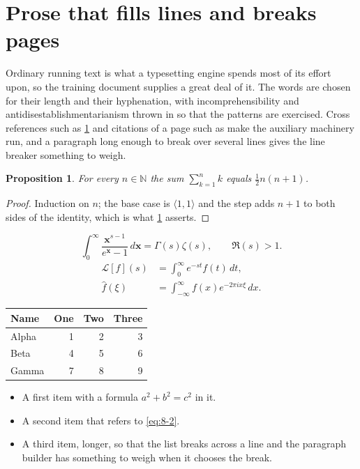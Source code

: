 \documentclass[11pt,a4paper]{report}
\theoremstyle{plain}
\newtheorem{proposition}{Proposition}[chapter]
\newcommand{\vecn}[1]{\mathbf{#1}}
\newcommand{\pairs}[2]{\langle #1,#2\rangle}
\begin{document}
\section{Prose that fills lines and breaks pages}
\label{sec:prose8-2}
Ordinary running text is what a typesetting engine spends most of its effort
upon, so the training document supplies a great deal of it. The words are
chosen for their length and their hyphenation, with incomprehensibility and
antidisestablishmentarianism thrown in so that the patterns are exercised.
Cross references such as \cref{sec:prose8-2} and citations of a page such
as \pageref{sec:prose8-2} make the auxiliary machinery run, and a
paragraph long enough to break over several lines gives the line breaker
something to weigh.
\begin{proposition}\label{prop:8-2}
For every $n\in\mathbb{N}$ the sum $\sum_{k=1}^{n}k$ equals
$\tfrac{1}{2}n(n+1)$.
\end{proposition}
\begin{proof}
Induction on $n$; the base case is $\pairs{1}{1}$ and the step adds $n+1$ to
both sides of the identity, which is what \cref{prop:8-2} asserts.
\end{proof}
\begin{equation}\label{eq:8-2}
  \int_{0}^{\infty}\frac{\vecn{x}^{s-1}}{e^{\vecn{x}}-1}\,d\vecn{x}
    = \Gamma(s)\zeta(s),\qquad \Re(s)>1 .
\end{equation}
\begin{align}
  \mathcal{L}[f](s) &= \int_{0}^{\infty} e^{-st} f(t)\,dt, \\
  \widehat{f}(\xi)  &= \int_{-\infty}^{\infty} f(x) e^{-2\pi i x\xi}\,dx .
\end{align}
\par\noindent\begin{center}
\begin{tabular}{lrrr}
\hline
Name & One & Two & Three \\
\hline
Alpha & 1 & 2 & 3 \\
Beta & 4 & 5 & 6 \\
Gamma & 7 & 8 & 9 \\
\hline
\end{tabular}
\end{center}
\begin{itemize}
  \item A first item with a formula $a^2+b^2=c^2$ in it.
  \item A second item that refers to \eqref{eq:8-2}.
  \item A third item, longer, so that the list breaks across a line and the
    paragraph builder has something to weigh when it chooses the break.
\end{itemize}
\end{document}
